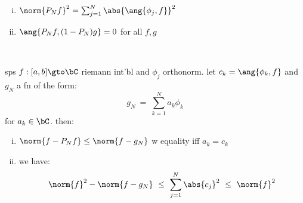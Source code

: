 \begin{crll} \vspace{-0.2in}
	\begin{enumerate}[i)]
		\item $\norm{P_{N}f}^{2}=\sum_{j=1}^{N}\abs{\ang{\phi_{j},f}}^{2}$
		\item $\ang{P_{N}f,(1-P_{N})g}=0$ for all $f,g$
	\end{enumerate}
\end{crll} \

\begin{thm}
	sps $f:[a,b]\gto\bC$ riemann int'bl and $\phi_{j}$ orthonorm.
	let $c_{k}=\ang{\phi_{k},f}$ and $g_{N}$ a fn of the form:
	\begin{equation*}
		g_{N} \ = \ \sum_{k=1}^{N}a_{k}\phi_{k}
	\end{equation*}
	for $a_{k}\in\bC$. then:
	\begin{enumerate}[i)]
		\item $\norm{f-P_{N}f}\leq\norm{f-g_{N}}$ w equality iff $a_{k}=c_{k}$
		\item we have:
			\begin{equation*}
				\norm{f}^{2}-\norm{f-g_{N}}
				\ \leq \ \sum_{j=1}^{N}\abs{c_{j}}^{2} \ \leq \ \norm{f}^{2}
			\end{equation*}
	\end{enumerate}
\end{thm} \

